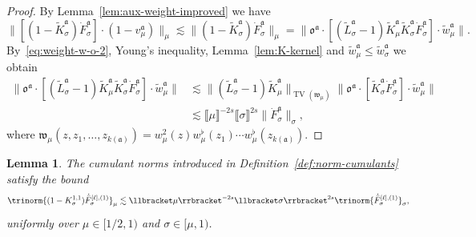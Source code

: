 \documentclass{article}
\numberwithin{equation}{section}
\theoremstyle{plain}
\newtheorem{lemma}[theorem]{Lemma}
\theoremstyle{definition}
\begin{document}
\begin{proof}
  By Lemma~\ref{lem:aux-weight-improved} we have
  \[ \| [(1 - \tilde{K}^{\mathfrak{a}}_{\sigma})
     \dot{F}^{\mathfrak{a}}_{\sigma}] \cdot (1 - v_{\mu}^{\mathfrak{a}})
     \|_{\mu} \lesssim \| (1 - \tilde{K}^{\mathfrak{a}}_{\sigma})
     \dot{F}^{\mathfrak{a}}_{\sigma} \|_{\mu} = \| \mathfrak{o}^{\mathfrak{a}}
     \cdot [(\tilde{L}^{\mathfrak{a}}_{\sigma} - 1)
     \tilde{K}^{\mathfrak{a}}_{\mu} \tilde{K}^{\mathfrak{a}}_{\sigma}
     \dot{F}^{\mathfrak{a}}_{\sigma}] \cdot \tilde{w}^{\mathfrak{a}}_{\mu}
     \|. 
  \]
  By~\eqref{eq:weight-w-o-2}, Young's inequality, Lemma~\ref{lem:K-kernel} and
  $\tilde{w}_{\mu}^{\mathfrak{a}} \leqslant \tilde{w}_{\sigma}^{\mathfrak{a}}$
  we obtain
  \begin{align*}
       \| \mathfrak{o}^{\mathfrak{a}} \cdot
       [(\tilde{L}^{\mathfrak{a}}_{\sigma} - 1) \tilde{K}^{\mathfrak{a}}_{\mu}
       \tilde{K}^{\mathfrak{a}}_{\sigma} \dot{F}^{\mathfrak{a}}_{\sigma}]
       \cdot \tilde{w}^{\mathfrak{a}}_{\mu} \| & \lesssim  \|
       (\tilde{L}^{\mathfrak{a}}_{\sigma} - 1) \tilde{K}^{\mathfrak{a}}_{\mu}
       \|_{\operatorname{TV} (\mathfrak{w}_{\mu})}  \|
       \mathfrak{o}^{\mathfrak{a}} \cdot [\tilde{K}^{\mathfrak{a}}_{\sigma}
       \dot{F}^{\mathfrak{a}}_{\sigma}] \cdot \tilde{w}^{\mathfrak{a}}_{\mu}
       \|\\
       & \lesssim  \llbracket \mu \rrbracket^{- 2 s} \llbracket \sigma
       \rrbracket^{2 s}  \| \dot{F}^{\mathfrak{a}}_{\sigma} \|_{\sigma},
  \end{align*}
  where $\mathfrak{w}_{\mu} (z, z_1, \ldots, z_{k
  (\mathfrak{a})}) {= w_{\mu}^2}  (z) {w_{\mu}^{\flat}}  (z_1) {\cdots
  w_{\mu}^{\flat}}  (z_{k (\mathfrak{a})})$.
\end{proof}

\begin{lemma}
  \label{lem:estimates-1-K}The cumulant norms introduced in
  Definition~\ref{def:norm-cumulants} satisfy the bound
  \[ \trinorm{ (1 - K^{1, 1}_{\sigma}) \dot{\bar{F}}_{\sigma}^{[\ell], (1)}
     }_{\mu} \lesssim \llbracket \mu \rrbracket^{- 2 s} \llbracket
     \sigma \rrbracket^{2 s}  \trinorm{ \dot{\bar{F}}_{\sigma}^{[\ell], (1)}
     }_{\sigma}, \]
  uniformly over $\mu \in [1 / 2, 1)$ and $\sigma \in [\mu, 1)$.
\end{lemma}
\end{document}
